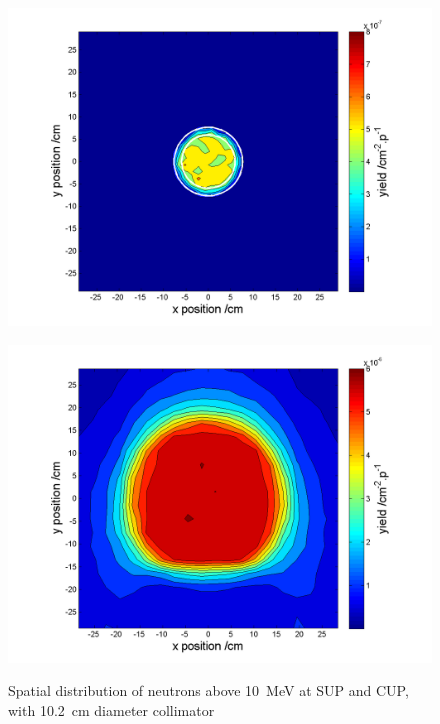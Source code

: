\documentclass[11pt,a4paper]{IEEEtran}
\let\MYoriglatexcaption\caption
\renewcommand{\caption}[2][\relax]{\MYoriglatexcaption[#2]{#2}}
\begin{document}
\begin{figure}[t]
    \begin{minipage}{\columnwidth}
        \includegraphics[width=\columnwidth]{SUP10ColSpatialDistribution10MeVRADECS.png}
        \label{fig:SUPDensity}
    \end{minipage}
    \begin{minipage}{\columnwidth}
        \includegraphics[width=\columnwidth]{CUP10ColSpatialDistribution10MeV.png}
        \label{fig:CUPDensity}
    \end{minipage}
    \caption{
        Spatial distribution of neutrons above \SI{10}{\MeV} at SUP and CUP, with \SI{10.2}{\cm} diameter collimator
    }
\end{figure}
\end{document}
